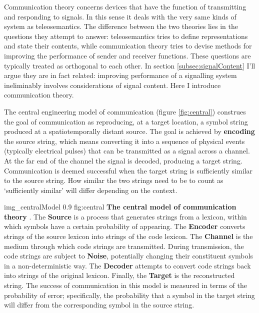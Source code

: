 \documentclass[12pt]{article}
\begin{document}
Communication theory concerns devices that have the function of transmitting and responding to signals.
In this sense it deals with the very same kinds of system as teleosemantics.
The difference between the two theories lies in the questions they attempt to answer: teleosemantics tries to define representations and state their contents, while communication theory tries to devise methods for improving the performance of sender and receiver functions.
These questions are typically treated as orthogonal to each other.
In section \ref{subsec:signalContent} I'll argue they are in fact related: improving performance of a signalling system ineliminably involves considerations of signal content.
Here I introduce communication theory.

The central engineering model of communication (figure \ref{fig:central}) construes the goal of communication as reproducing, at a target location, a symbol string produced at a spatiotemporally distant source.
The goal is achieved by \textbf{encoding} the source string, which means converting it into a sequence of physical events (typically electrical pulses) that can be transmitted as a signal across a channel.
At the far end of the channel the signal is decoded, producing a target string.
Communication is deemed successful when the target string is sufficiently similar to the source string.
How similar the two strings need to be to count as `sufficiently similar' will differ depending on the context.

\begin{myfig}
    {img_centralModel} %
    {0.9} %
    {fig:central} %
    {\textbf{The central model of communication theory} \citep[adapted from][p. 381 fig. 1]{shannon1948mathematicalc}. 
    The \textbf{Source} is a process that generates strings from a lexicon, within which symbols have a certain probability of appearing. 
    The \textbf{Encoder} converts strings of the source lexicon into strings of the code lexicon. 
    The \textbf{Channel} is the medium through which code strings are transmitted. 
    During transmission, the code strings are subject to \textbf{Noise}, potentially changing their constituent symbols in a non-deterministic way. 
    The \textbf{Decoder} attempts to convert code strings back into strings of the original lexicon. 
    Finally, the \textbf{Target} is the reconstructed string. 
    The success of communication in this model is measured in terms of the probability of error; specifically, the probability that a symbol in the target string will differ from the corresponding symbol in the source string.
    } %
\end{myfig}
\end{document}
